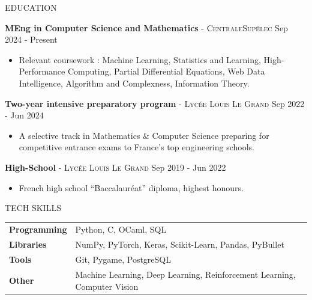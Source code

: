 \documentclass{resume}
\newcommand{\dateentry}[1]{\hfill{\small #1}}
\begin{document}
\begin{rSection}{EDUCATION}\vspace{-0.3em}

{\bf MEng in Computer Science and Mathematics} \textsc{- CentraleSupélec} \dateentry{ Sep 2024 - Present}
\vspace{-0.7em} 
\begin{itemize} [label=\scriptsize$\bullet$]
    \item Relevant coursework : Machine Learning, Statistics and Learning, High-Performance Computing, Partial Differential Equations, Web Data Intelligence, Algorithm and Complexness, Information Theory.
\end{itemize}
\vspace{-0.4em} 
{\bf Two-year intensive preparatory program} \textsc{- Lycée Louis Le Grand} \dateentry{ Sep 2022 - Jun 2024} 
\vspace{-0.7em} 
\begin{itemize} [label=\scriptsize$\bullet$]
    \item A selective track  in Mathematics \& Computer Science preparing for competitive entrance exams to France’s top engineering schools.
\end{itemize}
\vspace{-0.4em} 
{\bf High-School} \textsc{- Lycée Louis Le Grand} \dateentry{ Sep 2019 - Jun 2022} 
\vspace{-0.7em} 
\begin{itemize} [label=\scriptsize$\bullet$]
    \item French high school “Baccalauréat” diploma, highest honours.
\end{itemize}

\vspace{-0.6em}
\end{rSection}

\begin{rSection}{TECH SKILLS}\vspace{-0.3em}

\begin{tabularx}{\linewidth}{@{} >{\bfseries}l X }
Programming & Python, C, OCaml, SQL \\
Libraries & NumPy, PyTorch, Keras, Scikit-Learn, Pandas, PyBullet \\
Tools & Git, Pygame, PostgreSQL\\
Other & Machine Learning, Deep Learning, Reinforcement Learning, Computer Vision \\
\end{tabularx}

\vspace{-0.6em}
\end{rSection}
\end{document}
